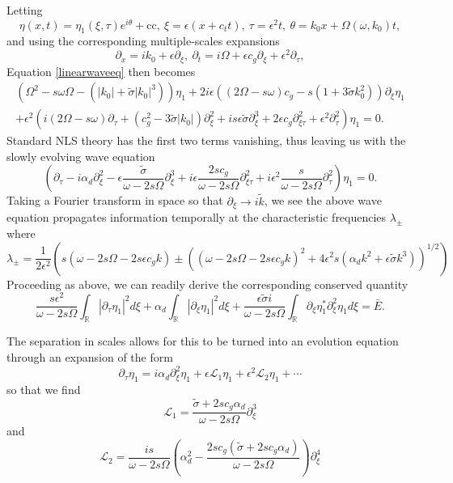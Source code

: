 \documentclass[a4paper,11pt]{article}
\newcommand{\pd}{\partial}
\begin{document}
Letting
\[
\eta(x,t) = \eta_{1}(\xi,\tau)e^{i\theta}+\mbox{cc}, ~ \xi = \epsilon(x+c_{t}t), ~ \tau = \epsilon^{2}t, ~ \theta = k_{0}x + \Omega(\omega,k_{0})t,
\]
and using the corresponding multiple-scales expansions
\[
\pd_{x} = ik_{0} + \epsilon \pd_{\xi}, ~ \pd_{t} = i\Omega + \epsilon c_{g}\pd_{\xi} + \epsilon^{2}\pd_{\tau}, 
\]
Equation \eqref{linearwaveeq} then becomes 
\begin{multline*}
\left(\Omega^{2} -s\omega\Omega - (|k_{0}|+\tilde{\sigma}|k_{0}|^{3})\right)\eta_{1} + 2i\epsilon\left((2\Omega-s\omega)c_{g} - s(1+3\tilde{\sigma}k_{0}^{2}) \right)\pd_{\xi}\eta_{1}\\
+ \epsilon^{2}\left(i(2\Omega-s\omega)\pd_{\tau}+(c^{2}_{g}-3\tilde{\sigma}|k_{0}|)\pd^{2}_{\xi} + is\epsilon\tilde{\sigma}\pd_{\xi}^{3} + 2\epsilon c_{g}\pd^{2}_{\xi \tau} + \epsilon^{2}\pd^{2}_{\tau}\right)\eta_{1} = 0.
\end{multline*}
Standard NLS theory has the first two terms vanishing, thus leaving us with the slowly evolving wave equation 
\[
\left(\pd_{\tau}-i\alpha_{d}\pd^{2}_{\xi} - \epsilon\frac{\tilde{\sigma}}{\omega-2s\Omega}\pd_{\xi}^{3} + i\epsilon \frac{2sc_{g}}{\omega-2s\Omega}\pd^{2}_{\xi \tau} + i\epsilon^{2}\frac{s}{\omega-2s\Omega}\pd^{2}_{\tau}\right)\eta_{1} = 0.
\]
Taking a Fourier transform in space so that $\pd_{\xi}\rightarrow i\tilde{k}$, we see the above wave equation propagates information temporally at the characteristic frequencies $\lambda_{\pm}$ where
\[
\lambda_{\pm} = \frac{1}{2\epsilon^{2}}\left(s(\omega-2s\Omega-2s\epsilon c_{g}k) \pm \left((\omega-2s\Omega-2s\epsilon c_{g}k)^{2} + 4\epsilon^{2}s(\alpha_{d}k^{2}+\epsilon\tilde{\sigma}k^{3}) \right)^{1/2} \right)
\]
Proceeding as above, we can readily derive the corresponding conserved quantity
\[
\frac{s\epsilon^{2}}{\omega-2s\Omega}\int_{\mathbb{R}}\left| \pd_{\tau}\eta_{1}\right|^{2}d\xi + \alpha_{d}\int_{\mathbb{R}} \left| \pd_{\xi}\eta_{1}\right|^{2}d\xi + \frac{\epsilon\tilde{\sigma}i}{\omega-2s\Omega}\int_{\mathbb{R}}\pd_{\xi}\eta^{\ast}_{1}\pd^{2}_{\xi}\eta_{1}d\xi= \bar{E}.
\]

The separation in scales allows for this to be turned into an evolution equation through an expansion of the form 
\[
\pd_{\tau}\eta_{1} = i\alpha_{d}\pd^{2}_{\xi}\eta_{1} + \epsilon \mathcal{L}_{1}\eta_{1} + \epsilon^{2}\mathcal{L}_{2}\eta_{1} + \cdots  
\]
so that we find
\[
\mathcal{L}_{1} = \frac{\tilde{\sigma}+2sc_{g}\alpha_{d}}{\omega - 2s\Omega}\pd^{3}_{\xi}
\]
and
\[
\mathcal{L}_{2} = \frac{is}{\omega-2s\Omega}\left(\alpha_{d}^{2}-\frac{2sc_{g}(\tilde{\sigma}+2sc_{g}\alpha_{d})}{\omega-2s\Omega}\right)\pd^{4}_{\xi}
\]
\end{document}
